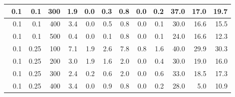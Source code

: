 \begin{longtable}{|r|r|r|r|r|r|r|r|r|r|r|r|}
    \hline \
    0.1                            & 0.1                     & 300                       & 1.9                       & 0.0                       & 0.3                       & 0.8                       & 0.0                       & 0.2                       & 37.0                      & 17.0                      & 19.7                      \\
    \hline \
    0.1                            & 0.1                    & 400                       & 3.4                       & 0.0                       & 0.5                       & 0.8                       & 0.0                       & 0.1                       & 30.0                      & 16.6                      & 15.5                      \\
    \hline \
    0.1                            & 0.1                    & 500                       & 0.4                       & 0.0                       & 0.1                       & 0.8                       & 0.0                       & 0.1                       & 24.0                      & 16.6                      & 12.3                      \\
    \hline \
    0.1                            & 0.25                    & 100                       & 7.1                       & 1.9                       & 2.6                       & 7.8                       & 0.8                       & 1.6                       & 40.0                      & 29.9                      & 30.3                      \\
    \hline \
    0.1                            & 0.25                    & 200                       & 3.0                       & 1.9                       & 1.6                       & 2.0                       & 0.0                       & 0.4                       & 30.0                      & 19.0                       & 16.0                      \\
    \hline \
    0.1                            & 0.25                    & 300                       & 2.4                       & 0.2                       & 0.6                       & 2.0                       & 0.0                       & 0.6                       & 33.0                      & 18.5                      & 17.3                      \\
    \hline \
    0.1                            & 0.25                     & 400                       & 3.4                       & 0.0                       & 0.9                       & 0.8                       & 0.0                       & 0.2                       & 28.0                      & 5.0                      & 10.9                      \\

\end{longtable}
